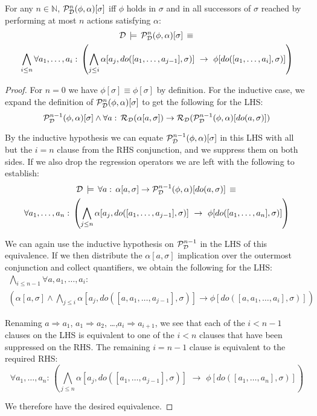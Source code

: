 \begin{thm}
For any $n\in\mathbb{N}$, $\mathcal{P}_{\mathcal{D}}^{n}(\phi,\alpha)[\sigma]$
iff $\phi$ holds in $\sigma$ and in all successors of $\sigma$
reached by performing at most $n$ actions satisfying $\alpha$:\begin{multline*}
\mathcal{D}\,\models\,\mathcal{P}_{\mathcal{D}}^{n}(\phi,\alpha)[\sigma]\,\equiv\,\\
\bigwedge_{i\leq n}\forall a_{1},\dots,a_{i}:\,\left(\bigwedge_{j\leq i}\alpha[a_{j},do([a_{1},\dots,a_{j-1}],\sigma)]\,\,\rightarrow\,\,\phi[do([a_{1},\dots,a_{i}],\sigma)]\right)\end{multline*}

\end{thm}
\begin{proof}
For $n=0$ we have $\phi[\sigma]\equiv\phi[\sigma]$ by definition.
For the inductive case, we expand the definition of $\mathcal{P}_{\mathcal{D}}^{n}(\phi,\alpha)[\sigma]$
to get the following for the LHS:\[
\mathcal{P}_{\mathcal{D}}^{n-1}(\phi,\alpha)[\sigma]\wedge\forall a:\,\mathcal{R}_{\mathcal{D}}(\alpha[a,\sigma])\rightarrow\mathcal{R}_{\mathcal{D}}(\mathcal{P}_{\mathcal{D}}^{n-1}(\phi,\alpha)[do(a,\sigma)])\]


By the inductive hypothesis we can equate $\mathcal{P}_{\mathcal{D}}^{n-1}(\phi,\alpha)[\sigma]$
in this LHS with all but the $i=n$ clause from the RHS conjunction,
and we suppress them on both sides. If we also drop the regression
operators we are left with the following to establish:\begin{multline*}
\mathcal{D}\,\models\,\forall a:\,\alpha[a,\sigma]\rightarrow\mathcal{P}_{\mathcal{D}}^{n-1}(\phi,\alpha)[do(a,\sigma)]\,\equiv\,\\
\forall a_{1},\dots,a_{n}:\,\left(\bigwedge_{j\leq n}\alpha[a_{j},do([a_{1},\dots,a_{j-1}],\sigma)]\,\,\rightarrow\,\,\phi[do([a_{1},\dots,a_{n}],\sigma)]\right)\end{multline*}


We can again use the inductive hypothesis on $\mathcal{P}_{\mathcal{D}}^{n-1}$ in
the LHS of this equivalence. If we then distribute the $\alpha[a,\sigma]$
implication over the outermost conjunction and collect quantifiers,
we obtain the following for the LHS:\begin{multline*}
\bigwedge_{i\leq n-1}\forall a,a_{1},\dots,a_{i}:\\
\left(\alpha[a,\sigma]\wedge\bigwedge_{j\leq i}\alpha[a_{j},do([a,a_{1},\dots,a_{j-1}],\sigma)]\rightarrow\phi[do([a,a_{1},\dots,a_{i}],\sigma)]\right)\end{multline*}


Renaming $a\Rightarrow a_{1}$, $a_{1}\Rightarrow a_{2}$, \ldots{},$a_{i}\Rightarrow a_{i+1}$,
we see that each of the $i<n-1$ clauses on the LHS is equivalent
to one of the $i<n$ clauses that have been suppressed on the RHS.
The remaining $i=n-1$ clause is equivalent to the required RHS: \[
\forall a_{1},\dots,a_{n}:\,\left(\bigwedge_{j\leq n}\alpha[a_{j},do([a_{1},\dots,a_{j-1}],\sigma)]\,\,\rightarrow\,\,\phi[do([a_{1},\dots,a_{n}],\sigma)]\right)\]


We therefore have the desired equivalence.
\end{proof}
